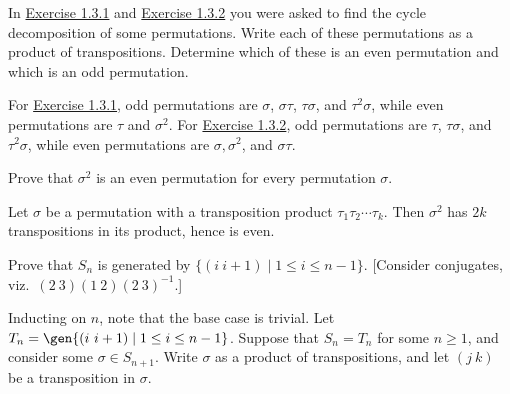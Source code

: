 \begin{problems}
    \item In \hyperref[ex1.3.1]{Exercise 1.3.1} and \hyperref[ex1.3.2]{Exercise 1.3.2} you were asked to find the cycle decomposition of some permutations. Write each of these permutations as a product of transpositions. Determine which of these is an even permutation and which is an odd permutation.
    \begin{sol}
        For \hyperref[ex1.3.1]{Exercise 1.3.1}, odd permutations are $\sigma$, $\sigma\tau$, $\tau\sigma$, and $\tau^2\sigma$, while even permutations are $\tau$ and $\sigma^2$. For \hyperref[ex1.3.2]{Exercise 1.3.2}, odd permutations are $\tau$, $\tau\sigma$, and $\tau^2\sigma$, while even permutations are $\sigma, \sigma^2$, and $\sigma\tau$.
    \end{sol}
    \item Prove that $\sigma^2$ is an even permutation for every permutation $\sigma$.
    \begin{sol}
        Let $\sigma$ be a permutation with a transposition product $\tau_1\tau_2 \cdots \tau_k$. Then $\sigma^2$ has $2k$ transpositions in its product, hence is even.
    \end{sol}
    \item Prove that $S_n$ is generated by $\{(i\ i+1)\mid 1 \le i \le n-1\}$. [Consider conjugates, viz.\ $(2\ 3)(1\ 2)(2\ 3)^{-1}$.]
    \begin{sol}
        Inducting on $n$, note that the base case is trivial. Let $T_n = \gen{(i\ i + 1) \mid 1 \leq i \leq n - 1}$. Suppose that $S_n = T_n$ for some $n \geq 1$, and consider some $\sigma \in S_{n + 1}$. Write $\sigma$ as a product of transpositions, and let $(j\ k)$ be a transposition in $\sigma$.


\end{sol}
\end{problems}
